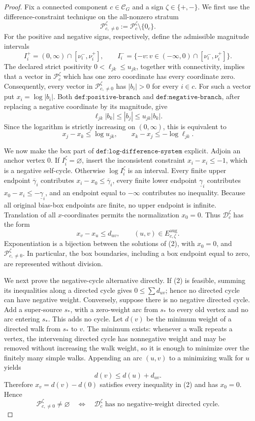 \documentclass{article}
\begin{document}
\begin{proof}
Fix a connected component \(c\in\mathcal C_G\) and a sign \(\zeta\in\{+,-\}\).  We first use the difference-constraint technique on the all-nonzero stratum
\[
\mathcal P_{c,\ne0}^{\zeta}:=\mathcal P_c^{\zeta}\setminus\{0_c\}.
\]
For the positive and negative signs, respectively, define the admissible magnitude intervals
\[
 I_i^+=(0,\infty)\cap[\nu_i^-,\nu_i^+],
 \qquad
 I_i^-=\{-v:v\in(-\infty,0)\cap[\nu_i^-,\nu_i^+]\}.
\]
The declared strict positivity \(0<\ell_{jk}\le u_{jk}\), together with connectivity, implies that a vector in \(\mathcal P_c^{\zeta}\) which has one zero coordinate has every coordinate zero.  Consequently, every vector in \(\mathcal P_{c,\ne0}^{\zeta}\) has \(|b_i|>0\) for every \(i\in c\).  For such a vector put \(x_i=\log|b_i|\).  Both \(\texttt{def:positive-branch}\) and \(\texttt{def:negative-branch}\), after replacing a negative coordinate by its magnitude, give
\[
 \ell_{jk}|b_k|\le |b_j|\le u_{jk}|b_k|.
\]
Since the logarithm is strictly increasing on \((0,\infty)\), this is equivalent to
\[
 x_j-x_k\le\log u_{jk},
 \qquad
 x_k-x_j\le-\log\ell_{jk}.
\tag{1}
\]

We now make the box part of \(\texttt{def:log-difference-system}\) explicit.  Adjoin an anchor vertex \(0\).  If \(I_i^{\zeta}=\varnothing\), insert the inconsistent constraint \(x_i-x_i\le-1\), which is a negative self-cycle.  Otherwise \(\log I_i^{\zeta}\) is an interval.  Every finite upper endpoint \(\overline\gamma_i\) contributes \(x_i-x_0\le\overline\gamma_i\), every finite lower endpoint \(\underline\gamma_i\) contributes \(x_0-x_i\le-\underline\gamma_i\), and an endpoint equal to \(-\infty\) contributes no inequality.  Because all original bias-box endpoints are finite, no upper endpoint is infinite.  Translation of all \(x\)-coordinates permits the normalization \(x_0=0\).  Thus \(\mathcal D_c^{\zeta}\) has the form
\[
 x_v-x_u\le d_{uv},\qquad (u,v)\in E_{c,\zeta}^{\mathrm{aug}}.
\tag{2}
\]
Exponentiation is a bijection between the solutions of (2), with \(x_0=0\), and \(\mathcal P_{c,\ne0}^{\zeta}\).  In particular, the box boundaries, including a box endpoint equal to zero, are represented without division.

We next prove the negative-cycle alternative directly.  If (2) is feasible, summing its inequalities along a directed cycle gives \(0\le\sum d_{uv}\); hence no directed cycle can have negative weight.  Conversely, suppose there is no negative directed cycle.  Add a super-source \(s_*\), with a zero-weight arc from \(s_*\) to every old vertex and no arc entering \(s_*\).  This adds no cycle.  Let \(d(v)\) be the minimum weight of a directed walk from \(s_*\) to \(v\).  The minimum exists: whenever a walk repeats a vertex, the intervening directed cycle has nonnegative weight and may be removed without increasing the walk weight, so it is enough to minimize over the finitely many simple walks.  Appending an arc \((u,v)\) to a minimizing walk for \(u\) yields
\[
 d(v)\le d(u)+d_{uv}.
\]
Therefore \(x_v=d(v)-d(0)\) satisfies every inequality in (2) and has \(x_0=0\).  Hence
\[
 \mathcal P_{c,\ne0}^{\zeta}\ne\varnothing
 \quad\Longleftrightarrow\quad
 \mathcal D_c^{\zeta}\text{ has no negative-weight directed cycle}.
\tag{3}
\]


\end{proof}
\end{document}

